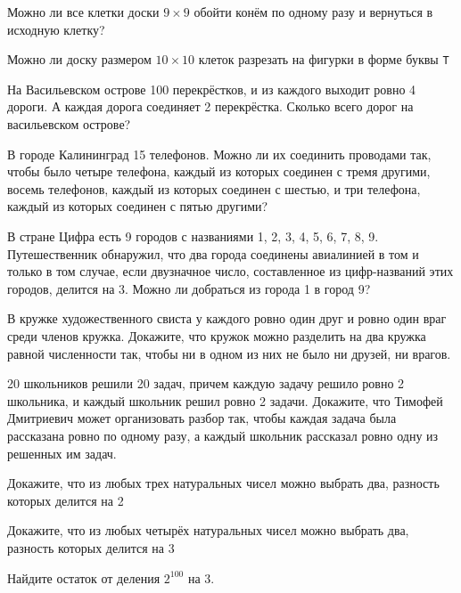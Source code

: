 \documentclass{article}
\begin{document}
\begin{enumerate_boxed}
        \item Можно ли все клетки доски $9 \times 9$ обойти конём по одному разу и вернуться в исходную клетку?

        \item Можно ли доску размером $10 \times 10$ клеток разрезать на фигурки в форме буквы \texttt{T}

        \item На Васильевском острове 100 перекрёстков, и из каждого выходит ровно 4 дороги.
        А каждая дорога соединяет 2 перекрёстка.
        Сколько всего дорог на васильевском острове?

        \item В городе Калининград 15 телефонов.
        Можно ли их соединить проводами так, чтобы было четыре телефона, каждый из которых соединен с тремя другими, восемь телефонов, каждый из которых соединен с шестью, и три телефона, каждый из которых соединен с пятью другими?

        \item В стране Цифра есть 9 городов с названиями 1, 2, 3, 4, 5, 6, 7, 8, 9.
        Путешественник обнаружил, что два города соединены авиалинией в том и только в том случае, если двузначное число, составленное из цифр-названий этих городов, делится на 3.
        Можно ли добраться из города 1 в город 9?

        \item В кружке художественного свиста у каждого ровно один друг и ровно один враг среди членов кружка.
        Докажите, что кружок можно разделить на два кружка равной численности так, чтобы ни в одном из них не было ни друзей, ни врагов.

        \item 20 школьников решили 20 задач, причем каждую задачу решило ровно 2 школьника, и каждый школьник решил ровно 2 задачи.
        Докажите, что Тимофей Дмитриевич может организовать разбор так, чтобы каждая задача была рассказана ровно по одному разу, а каждый школьник рассказал ровно одну из решенных им задач.

        \item Докажите, что из любых трех натуральных чисел можно выбрать два, разность которых делится на 2

        \item Докажите, что из любых четырёх натуральных чисел можно выбрать два, разность которых делится на 3

        \item Найдите остаток от деления $2^{100}$ на 3.


\end{enumerate_boxed}
\end{document}
